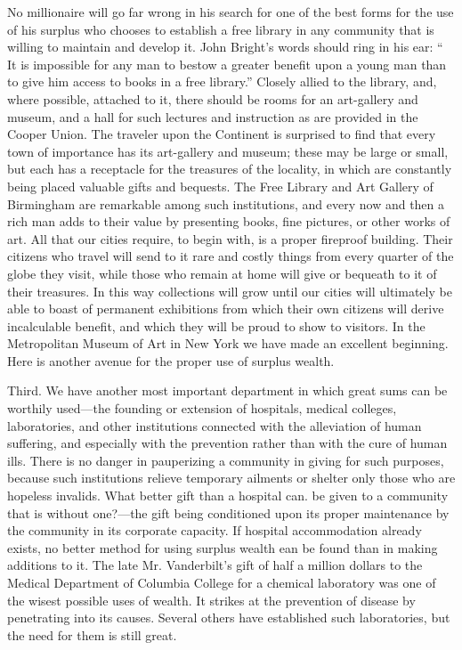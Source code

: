 \documentclass[11pt,openany]{book}
\begin{document}
No millionaire will go far wrong in his search for one of the best forms for the use of his surplus who chooses to establish a free library in any community that is willing to maintain and develop it. John Bright's words should ring in his ear: `` It is impossible for any man to bestow a greater benefit upon a young man than to give him access to books in a free library.'' Closely allied to the library, and, where possible, attached to it, there should be rooms for an art-gallery and museum, and a hall for such lectures and instruction as are provided in the Cooper Union. The traveler upon the Continent is surprised to find that every town of importance has its art-gallery and museum; these may be large or small, but each has a receptacle for the treasures of the locality, in which are constantly being placed valuable gifts and bequests. The Free Library and Art Gallery of Birmingham are remarkable among such institutions, and every now and then a rich man adds to their value by presenting books, fine pictures, or other works of art. All that our cities require, to begin with, is a proper fireproof building. Their citizens who travel will send to it rare and costly things from every quarter of the globe they visit, while those who remain at home will give or bequeath to it of their treasures. In this way collections will grow until our cities will ultimately be able to boast of permanent exhibitions from which their own citizens will derive incalculable benefit, and which they will be proud to show to visitors. In the Metropolitan Museum of Art in New York we have made an excellent beginning. Here is another avenue for the proper use of surplus wealth.

Third. We have another most important department in which great sums can be worthily used---the founding or extension of hospitals, medical colleges, laboratories, and other institutions connected with the alleviation of human suffering, and especially with the prevention rather than with the cure of human ills. There is no danger in pauperizing a community in giving for such purposes, because such institutions relieve temporary ailments or shelter only those who are hopeless invalids. What better gift than a hospital can. be given to a community that is without one?---the gift being conditioned upon its proper maintenance by the community in its corporate capacity. If hospital accommodation already exists, no better method for using surplus wealth ean be found than in making additions to it. The late Mr. Vanderbilt's gift of half a million dollars to the Medical Department of Columbia College for a chemical laboratory was one of the wisest possible uses of wealth. It strikes at the prevention of disease by penetrating into its causes. Several others have established such laboratories, but the need for them is still great.
\end{document}
